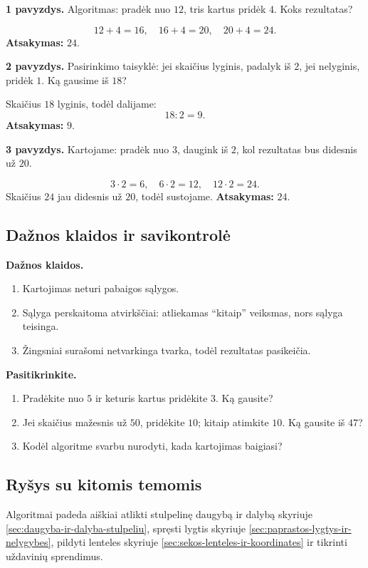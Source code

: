 \textbf{1 pavyzdys.} Algoritmas: pradėk nuo \(12\), tris kartus pridėk \(4\). Koks rezultatas?

\[
12+4=16,\quad 16+4=20,\quad 20+4=24.
\]
\textbf{Atsakymas:} \(24\).

\textbf{2 pavyzdys.} Pasirinkimo taisyklė: jei skaičius lyginis, padalyk iš \(2\), jei nelyginis, pridėk \(1\). Ką gausime iš \(18\)?

Skaičius \(18\) lyginis, todėl dalijame:
\[
18:2=9.
\]
\textbf{Atsakymas:} \(9\).

\textbf{3 pavyzdys.} Kartojame: pradėk nuo \(3\), daugink iš \(2\), kol rezultatas bus didesnis už \(20\).

\[
3\cdot2=6,\quad 6\cdot2=12,\quad 12\cdot2=24.
\]
Skaičius \(24\) jau didesnis už \(20\), todėl sustojame.
\textbf{Atsakymas:} \(24\).

\subsection{Dažnos klaidos ir savikontrolė}

\textbf{Dažnos klaidos.}
\begin{enumerate}[label=\arabic*.]
\item Kartojimas neturi pabaigos sąlygos.
\item Sąlyga perskaitoma atvirkščiai: atliekamas ``kitaip'' veiksmas, nors sąlyga teisinga.
\item Žingsniai surašomi netvarkinga tvarka, todėl rezultatas pasikeičia.
\end{enumerate}

\textbf{Pasitikrinkite.}
\begin{enumerate}[label=\arabic*.]
\item Pradėkite nuo \(5\) ir keturis kartus pridėkite \(3\). Ką gausite?
\item Jei skaičius mažesnis už \(50\), pridėkite \(10\); kitaip atimkite \(10\). Ką gausite iš \(47\)?
\item Kodėl algoritme svarbu nurodyti, kada kartojimas baigiasi?
\end{enumerate}

\subsection{Ryšys su kitomis temomis}

Algoritmai padeda aiškiai atlikti stulpelinę daugybą ir dalybą skyriuje \ref{sec:daugyba-ir-dalyba-stulpeliu}, spręsti lygtis skyriuje \ref{sec:paprastos-lygtys-ir-nelygybes}, pildyti lenteles skyriuje \ref{sec:sekos-lenteles-ir-koordinates} ir tikrinti uždavinių sprendimus.

